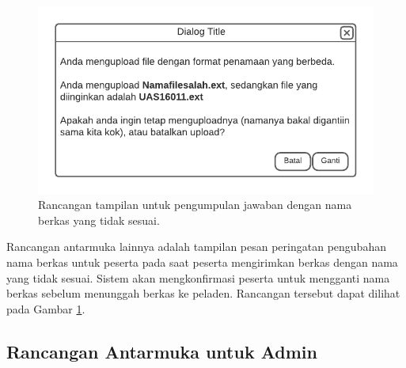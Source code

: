     \begin{figure}
        \centering
        \includegraphics{Gambar/mockups/Mockup--Peserta - Mismatch Filename.pdf}
        \caption{Rancangan tampilan untuk pengumpulan jawaban dengan nama berkas yang tidak sesuai.}
        \label{fig:mockup_peserta_mismatch}
    \end{figure}
    Rancangan antarmuka lainnya adalah tampilan pesan peringatan pengubahan nama berkas
    untuk peserta pada saat peserta mengirimkan berkas dengan nama yang tidak sesuai.
    Sistem akan mengkonfirmasi peserta untuk mengganti nama berkas sebelum menunggah
    berkas ke peladen. Rancangan tersebut dapat dilihat pada Gambar 
    \ref{fig:mockup_peserta_mismatch}.
    
\subsection{Rancangan Antarmuka untuk Admin}
    
